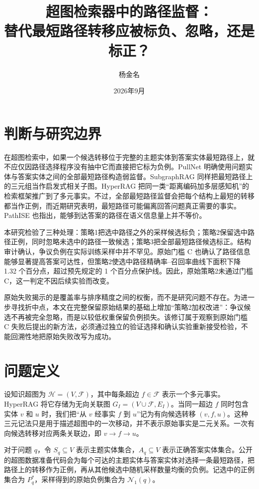 \documentclass[UTF8,11pt]{ctexart}
\title{超图检索器中的路径监督：\\
替代最短路径转移应被标负、忽略，还是标正？}
\author{杨金名}
\date{2026年9月}
\newcommand{\Norig}{\mathcal{N}_{1}}
\begin{document}
\maketitle

\section{判断与研究边界}

在超图检索中，如果一个候选转移位于完整的主题实体到答案实体最短路径上，就不应仅因路径选择程序没有抽中它而直接把它标为负例。PullNet 明确使用问题实体与答案实体之间的全部最短路径构造弱监督\citep{sun2019pullnet}。SubgraphRAG 同样把最短路径上的三元组当作启发式相关子图\citep{li2025subgraphrag}。HyperRAG 把同一类“距离编码加多层感知机”的检索框架推广到了多元事实\citep{lien2026hyperrag}。不过，全部最短路径监督会把每个结构上最短的转移都当作正例，而近期研究表明，最短路径可能偏离回答问题真正需要的事实\citep{cattaneo2025groundtruth}。PathISE 也指出，能够到达答案的路径在语义信息量上并不等价\citep{gao2026pathise}。

本研究检验了三种处理：策略1把选中路径之外的采样候选标负；策略2保留选中路径正例，同时忽略未选中的路径一致候选；策略3把全部最短路径候选标正。结构审计确认，争议负例在实际训练采样中并不罕见。原始门槛 C 也确认了路径信息能够显著提高答案可达性，但策略2使选中路径精确率--召回率曲线下面积下降 1.32 个百分点，超过预先规定的 1 个百分点保护线。因此，原始策略2未通过门槛 C，这一判定不因后续实验而改变。

原始失败揭示的是覆盖率与排序精度之间的权衡，而不是研究问题不存在。为进一步寻找折中点，本文在完整保留原始结果的基础上增加“策略2加权改进”：争议候选不再被完全忽略，而是以较低权重保留负例损失。该修订属于观察到原始门槛 C 失败后提出的新方法，必须通过独立的验证选择和确认实验重新接受检验，不能回溯性地把原始失败改写为成功。

\section{问题定义}

设知识超图为 $\mathcal{H}=(V,\mathcal{F})$，其中每条超边 $f\in\mathcal{F}$ 表示一个多元事实。HyperRAG 将它存储为无向关联图 $G_I=(V\cup\mathcal{F},E_I)$。当同一超边 $f$ 同时包含实体 $v$ 和 $u$ 时，我们把“从 $v$ 经事实 $f$ 到 $u$”记为有向候选转移 $(v,f,u)$。这种三元记法只是用于描述超图中的一次移动，并不表示原始事实是二元关系。一次有向候选转移对应两条关联边，即 $v\!\rightarrow\!f\!\rightarrow\!u$。

对于问题 $q$，令 $S_q\subseteq V$ 表示主题实体集合，$A_q\subseteq V$ 表示正确答案实体集合。公开的超图数据准备代码会为每个可达的主题实体与答案实体对选择一条最短路径，把路径上的转移作为正例，再从其他候选中随机采样数量均衡的负例。记选中的正例集合为 $P_q^*$，采样得到的原始负例集合为 $\Norig(q)$。
\end{document}
